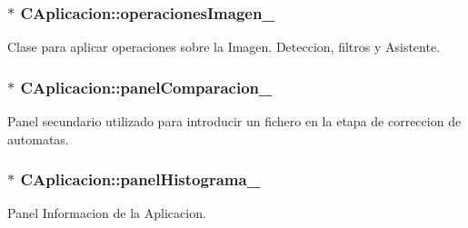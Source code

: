\subsubsection[{\texorpdfstring{operaciones\+Imagen\+\_\+}{operacionesImagen_}}]{$\ast$ C\+Aplicacion\+::operaciones\+Imagen\+\_\+\hspace{0.3cm}{\ttfamily [private]}}\hypertarget{classCAplicacion_a58596bdd1d1e018bcb8bd58b64de538e}{}\label{classCAplicacion_a58596bdd1d1e018bcb8bd58b64de538e}


Clase para aplicar operaciones sobre la Imagen. Deteccion, filtros y Asistente. 

\subsubsection[{\texorpdfstring{panel\+Comparacion\+\_\+}{panelComparacion_}}]{$\ast$ C\+Aplicacion\+::panel\+Comparacion\+\_\+\hspace{0.3cm}{\ttfamily [private]}}\hypertarget{classCAplicacion_a16f1c9d4fd9168f0787c210588a048be}{}\label{classCAplicacion_a16f1c9d4fd9168f0787c210588a048be}


Panel secundario utilizado para introducir un fichero en la etapa de correccion de automatas. 

\subsubsection[{\texorpdfstring{panel\+Histograma\+\_\+}{panelHistograma_}}]{$\ast$ C\+Aplicacion\+::panel\+Histograma\+\_\+\hspace{0.3cm}{\ttfamily [private]}}\hypertarget{classCAplicacion_a5edbe0644420ff42d80a2a5d247c69eb}{}\label{classCAplicacion_a5edbe0644420ff42d80a2a5d247c69eb}


Panel Informacion de la Aplicacion. 

